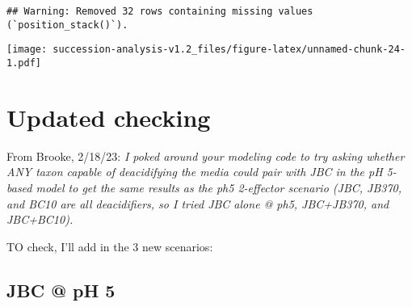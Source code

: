 \documentclass[
]{article}
\begin{document}
\begin{verbatim}
## Warning: Removed 32 rows containing missing values (`position_stack()`).
\end{verbatim}

\texttt{[image: succession-analysis-v1.2\_files/figure-latex/unnamed-chunk-24-1.pdf]}

\hypertarget{updated-checking}{%
\section{Updated checking}\label{updated-checking}}

From Brooke, 2/18/23: \emph{I poked around your modeling code to try
asking whether ANY taxon capable of deacidifying the media could pair
with JBC in the pH 5-based model to get the same results as the ph5
2-effector scenario (JBC, JB370, and BC10 are all deacidifiers, so I
tried JBC alone @ ph5, JBC+JB370, and JBC+BC10).}

TO check, I'll add in the 3 new scenarios:

\hypertarget{jbc-ph-5}{%
\subsection{JBC @ pH 5}\label{jbc-ph-5}}
\end{document}
